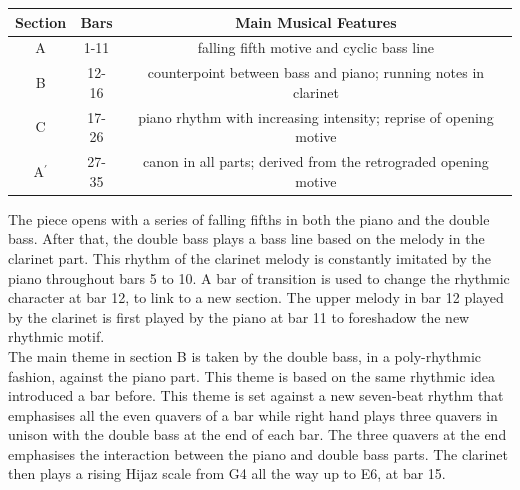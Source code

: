 \documentclass{article}
\begin{document}
\begin{center}
	\def\arraystretch{1.5}
\begin{tabular}{|c|c|c|}
	\hline
	Section&Bars&Main Musical Features\\
	\hline
	A&1-11&falling fifth motive and cyclic bass line\\
	\hline
	B&12-16&counterpoint between bass and piano; running notes in clarinet\\
	\hline
	C&17-26&piano rhythm with increasing intensity; reprise of opening motive\\
	\hline
	A\(^\prime\)&27-35&canon in all parts; derived from the retrograded opening motive\\
	\hline
\end{tabular}
\end{center}

The piece opens with a series of falling fifths in both the piano and the
double bass. After that, the double bass plays a bass line based on the melody
in the clarinet part. This rhythm of the clarinet melody is constantly imitated
by the piano throughout bars 5 to 10. A bar of transition is used to change the
rhythmic character at bar 12, to link to a new section. The upper melody in bar
12 played by the clarinet is first played by the piano at bar 11 to foreshadow
the new rhythmic motif.\\

The main theme in section B is taken by the double bass, in a poly-rhythmic
fashion, against the piano part. This theme is based on the same rhythmic idea
introduced a bar before. This theme is set against a new seven-beat rhythm that
emphasises all the even quavers of a bar while right hand plays three quavers
in unison with the double bass at the end of each bar. The three quavers at the
end emphasises the interaction between the piano and double bass parts. The
clarinet then plays a rising Hijaz scale from G4 all the way up to E6, at bar
15.\\
\end{document}
